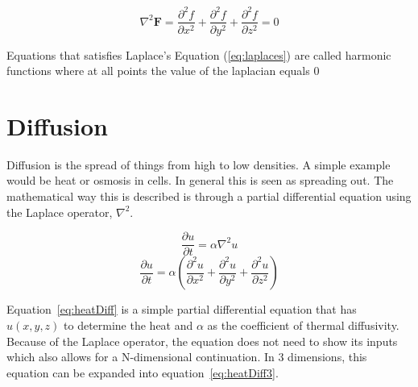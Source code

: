 \documentclass[12pt, letterpaper]{article}
\begin{document}
\begin{equation}
  \nabla^2 \mathbf{F} = \frac{\partial^2 f}{\partial x^2} + \frac{\partial^2 f}{\partial y^2} +
  \frac{\partial^2 f}{\partial z^2} = 0
  \label{eq:laplaces}
\end{equation}

Equations that satisfies Laplace's Equation (\ref{eq:laplaces}) are called harmonic functions where at all
points the value of the laplacian equals $0$

\section{Diffusion} \label{diffusion}

Diffusion is the spread of things from high to low densities. A simple example would be heat or osmosis in 
cells. In general this is seen as spreading out. The mathematical way this is described is through a partial
differential equation using the Laplace operator, $ \nabla^2 $.

\begin{equation}
  \frac{\partial u}{\partial t} = \alpha \nabla^2 u
  \label{eq:heatDiff}
\end{equation}
\begin{equation}
  \frac{\partial u}{\partial t} = \alpha (\frac{\partial^2 u}{\partial x^2} + \frac{\partial^2 u}{\partial
  y^2} + \frac{\partial^2 u}{\partial z^2})
  \label{eq:heatDiff3}
\end{equation}

Equation~\ref{eq:heatDiff} is a simple partial differential equation that has $u(x, y, z)$ 
to determine the heat and $\alpha$ as the coefficient of thermal diffusivity. Because of the Laplace
operator, the equation does not need to show its inputs which also allows for a N-dimensional continuation.
In 3 dimensions, this equation can be expanded into equation~\ref{eq:heatDiff3}.
\end{document}

